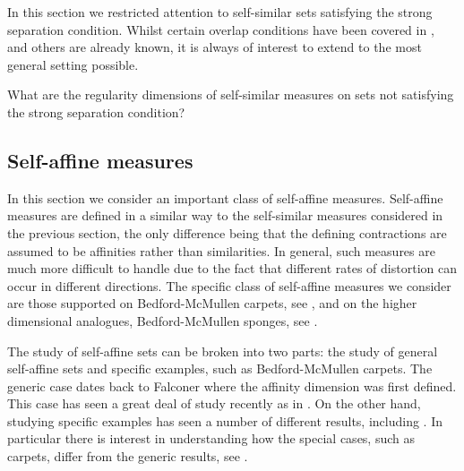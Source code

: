 In this section we restricted attention to self-similar sets satisfying the strong separation condition. Whilst certain overlap conditions have been covered in \cite{hare-hare-tros}, and others are already known, it is always of interest to extend to the most general setting possible.
\begin{question}
What are the regularity dimensions of self-similar measures on sets not satisfying the strong separation condition?
\end{question}





\subsection{Self-affine measures}\label{ch-upper-reg:sec:self-affineresults}


In this section we consider an important class of self-affine measures.  Self-affine measures are defined in a similar way to the self-similar measures considered in the previous section, the only difference being that the defining contractions are assumed to be affinities rather than similarities.  In general, such measures are much more difficult to handle due to the fact that different rates of distortion can occur in different directions.  The specific class of self-affine measures we consider are those supported on Bedford-McMullen carpets, see \cite{bedford, mcmullen}, and on the higher dimensional analogues, Bedford-McMullen sponges, see \cite{kenyonperes, sponges}. 

The study of self-affine sets can be broken into two parts: the study of general self-affine sets and specific examples, such as Bedford-McMullen carpets. The generic case dates back to Falconer \cite{falconer-affine} where the affinity dimension was first defined. This case has seen a great deal of study recently as in \cite{barany-hochman-rapaport,hochman-rapaport}. On the other hand, studying specific examples has seen a number of different results, including \cite{bedford,mcmullen, lalley-gatzouras, baranski, mackay, Fr}. In particular there is interest in understanding how the special cases, such as carpets, differ from the generic results, see \cite{jurga-morris, morris-sert}. 

